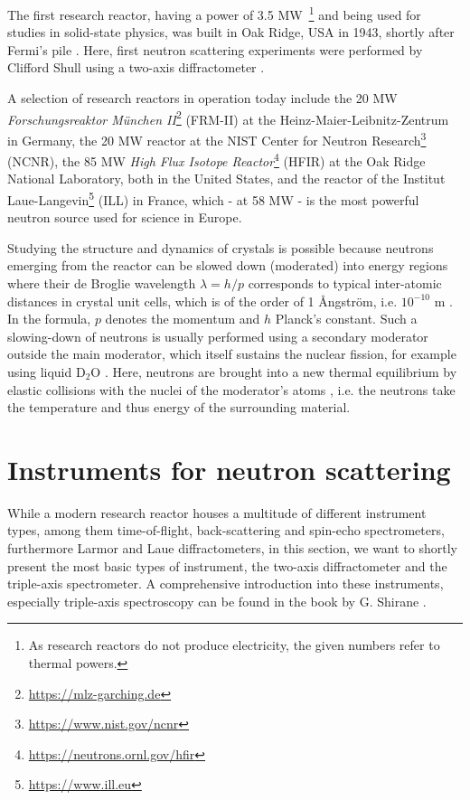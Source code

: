 The first research reactor, having a power of 3.5 MW~\footnote{As research reactors do not produce electricity, the given numbers refer to thermal powers.} and being used for studies in solid-state physics, was built in Oak Ridge, USA in 1943, shortly after Fermi's pile \cite[p. 3]{Jacrot2021}. 
Here, first neutron scattering experiments were performed by Clifford Shull using a two-axis diffractometer \cite[pp. 3, 37]{Jacrot2021}.

A selection of research reactors in operation today include the 20 MW \textit{Forschungsreaktor M\"unchen II}\footnote{\url{https://mlz-garching.de}} (FRM-II) at the Heinz-Maier-Leibnitz-Zentrum in Germany, the 20 MW reactor at the NIST Center for Neutron Research\footnote{\url{https://www.nist.gov/ncnr}} (NCNR), the 85 MW \textit{High Flux Isotope Reactor}\footnote{\url{https://neutrons.ornl.gov/hfir}} (HFIR) at the Oak Ridge National Laboratory, both in the United States, and the reactor of the Institut Laue-Langevin\footnote{\url{https://www.ill.eu}} (ILL) in France, which - at 58 MW - is the most powerful neutron source used for science in Europe.

Studying the structure and dynamics of crystals is possible because neutrons emerging from the reactor can be slowed down (moderated) into energy regions where their de Broglie wavelength $\lambda = h/p$ corresponds to typical inter-atomic distances in crystal unit cells, which is of the order of 1 \AA{}ngstr\"om, i.e. $10^{-10}$ m \cite[pp.1,3]{Squires2012}. In the formula, $p$ denotes the momentum and $h$ Planck's constant. Such a slowing-down of neutrons is usually performed using a secondary moderator outside the main moderator, which itself sustains the nuclear fission, for example using liquid $\mathrm{D_2O}$ \cite[p. 82]{Jacrot2021}. Here, neutrons are brought into a new thermal equilibrium by elastic collisions with the nuclei of the moderator's atoms \cite[p. 30]{Stacey2007}, i.e. the neutrons take the temperature and thus energy of the surrounding material.



\section{Instruments for neutron scattering \label{sec:instruments}}

While a modern research reactor houses a multitude of different instrument types, among them time-of-flight, back-scattering and spin-echo spectrometers, furthermore Larmor and Laue diffractometers, in this section, we want to shortly present the most basic types of instrument, the two-axis diffractometer and the triple-axis spectrometer. A comprehensive introduction into these instruments, especially triple-axis spectroscopy can be found in the book by G. Shirane \cite{Shirane2002}.


